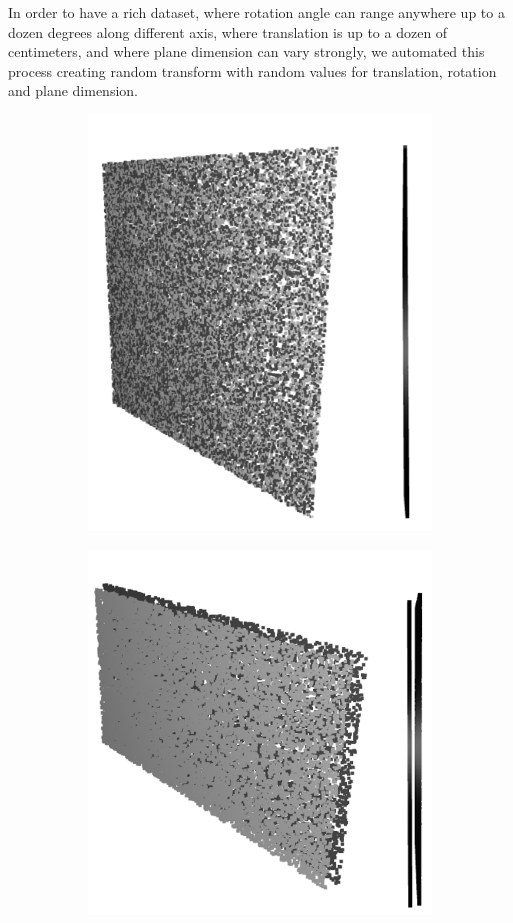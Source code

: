 In order to have a rich dataset, where rotation angle can range anywhere up to a dozen degrees along different axis, where translation is up to a dozen of centimeters, and where plane dimension can vary strongly, we automated this process creating random transform with random values for translation, rotation and plane dimension.\\
\begin{figure}[ht]
    \begin{subfigure}{.32\linewidth}
    \centering
    \includegraphics[scale=0.4]{Img/06_plane1.png}
    \end{subfigure}
    \begin{subfigure}{.32\linewidth}
    \centering
    \includegraphics[scale=0.4]{Img/06_plane2.png}

\end{subfigure}
\end{figure}
